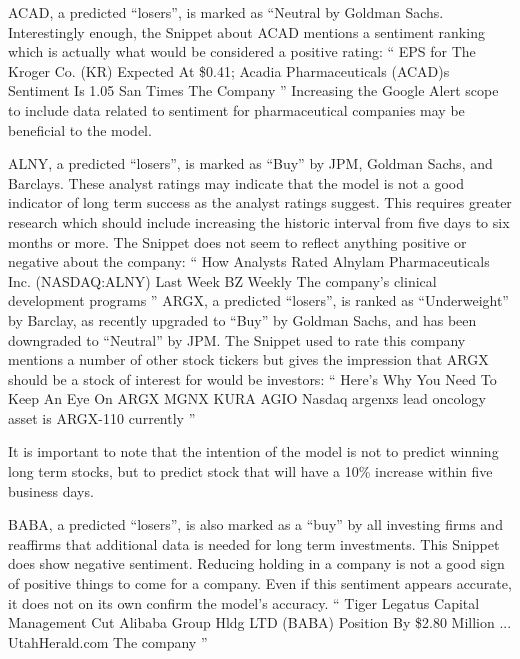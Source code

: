 \documentclass[sigconf]{acmart}
\begin{document}
ACAD, a predicted ``losers'', is marked as ``Neutral by Goldman Sachs. Interestingly enough, the Snippet about ACAD mentions a sentiment ranking which is actually what would be considered a positive rating:
``
EPS for The Kroger Co. (KR) Expected At \$0.41; Acadia Pharmaceuticals (ACAD)s Sentiment Is 1.05 San Times The Company
''
Increasing the Google Alert scope to include data related to sentiment for pharmaceutical companies may be beneficial to the model.

ALNY, a predicted ``losers'', is marked as ``Buy'' by JPM, Goldman Sachs, and Barclays. These analyst ratings may indicate that the model is not a good indicator of long term success as the analyst ratings suggest. This requires greater research which should include increasing the historic interval from five days to six months or more. The Snippet does not seem to reflect anything positive or negative about the company:
``
How Analysts Rated Alnylam Pharmaceuticals Inc. (NASDAQ:ALNY) Last Week BZ Weekly The company's clinical development programs
''
ARGX, a predicted ``losers'', is ranked as ``Underweight'' by Barclay, as recently upgraded to ``Buy'' by Goldman Sachs, and has been downgraded to ``Neutral'' by JPM. The Snippet used to rate this company mentions a number of other stock tickers but gives the impression that ARGX should be a stock of interest for would be investors:
``
Here's Why You Need To Keep An Eye On ARGX MGNX KURA AGIO Nasdaq argenxs lead oncology asset is ARGX-110 currently
''

 It is important to note that the intention of the model is not to predict winning long term stocks, but to predict stock that will have a 10\% increase within five business days.

BABA, a predicted ``losers'', is also marked as a ``buy'' by all investing firms and reaffirms that additional data is needed for long term investments. This Snippet does show negative sentiment. Reducing holding in a company is not a good sign of positive things to come for a company. Even if this sentiment appears accurate, it does not on its own confirm the model's accuracy.
``
Tiger Legatus Capital Management Cut Alibaba Group Hldg LTD (BABA) Position By \$2.80 Million ... UtahHerald.com The company
''
\end{document}
